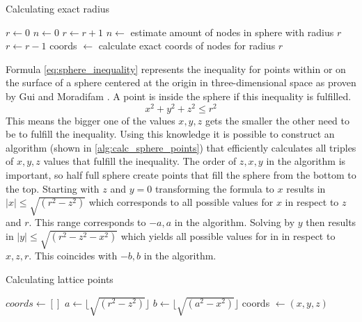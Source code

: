 \begin{algorithm}
\caption{Calculating exact radius}
\label{alg:exact_radius_improved}
\begin{algorithmic}
\State $r \gets 0$
\State $n \gets 0$
    \State $r \gets r + 1$
    \State $n \gets$ estimate amount of nodes in sphere with radius $r$
\EndWhile
\State $ r \gets r - 1$
    \State coords $\gets$ calculate exact coords of nodes for radius $r$
\EndWhile
\end{algorithmic}
\end{algorithm}

Formula \ref{eq:sphere_inequality} represents the inequality for points within or on the surface of a sphere centered at the origin in three-dimensional space as proven by Gui and Moradifam \cite{sphereInequality}. A point is inside the sphere if this inequality is fulfilled.
\begin{equation}
\label{eq:sphere_inequality}
    x^2 + y^2 + z^2 \leq r^2
\end{equation}
This means the bigger one of the values $x,y,z$ gets the smaller the other need to be to fulfill the inequality. Using this knowledge it is possible to construct an algorithm (shown in \ref{alg:calc_sphere_points}) that efficiently calculates all triples of $x,y,z$ values that fulfill the inequality. The order of $z,x,y$ in the algorithm is important, so half full sphere create points that fill the sphere from the bottom to the top.
Starting with $z$ and $y=0$ transforming the formula to $x$ results in $|x| \leq \sqrt{(r^2 - z^2)}$ which corresponds to all possible values for $x$ in respect to $z$ and $r$. This range corresponds to $-a,a$ in the algorithm. Solving by $y$ then results in $|y| \leq \sqrt{(r^2 - z^2 - x^2)}$ which yields all possible values for in in respect to $x,z,r$. This coincides with $-b,b$ in the algorithm.

\begin{algorithm}
\caption{Calculating lattice points}
\label{alg:calc_sphere_points}
\begin{algorithmic}
\State $coords \gets []$
    \State $a \gets \lfloor\sqrt{(r^2 - z^2)}\rfloor$
        \State $b \gets \lfloor\sqrt{(a^2 - x^2)}\rfloor$
            \State coords $\gets (x,y,z)$
        \EndFor
    \EndFor
\EndFor
\end{algorithmic}
\end{algorithm}

